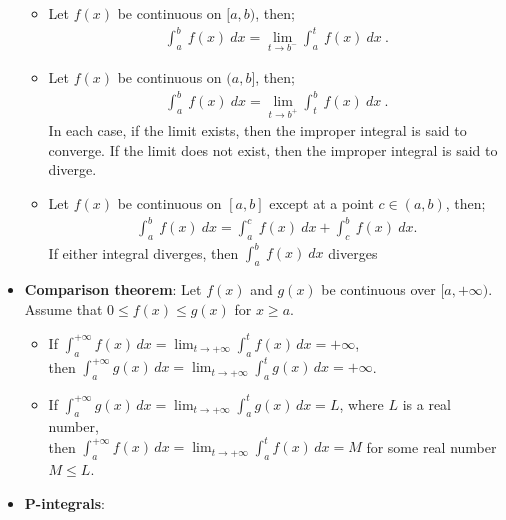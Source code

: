 \documentclass{report}
\begin{document}
\begin{itemize}
\begin{itemize}
                \item Let $f(x)$ be continuous on $[a,b)$, then;
                    \begin{align*}
                        \int_{a}^{b}\ f(x)\ dx = \lim\limits_{t \to b^{-}}{\int_{a}^{t}\ f(x)\ dx}\
                    .\end{align*}
                \item Let $f(x)$ be continuous on $(a,b]$, then;
                    \begin{align*}
                        \int_{a}^{b}\ f(x)\ dx = \lim\limits_{t \to b^{+}}{\int_{t}^{b}\ f(x)\ dx}\
                    .\end{align*}
                    In each case, if the limit exists, then the improper integral is said to converge. If the limit does not exist, then the improper integral is said to diverge.
                \item Let $f(x)$ be continuous on $[a,b]$ except at a point $c \in (a,b)$, then;
                    \begin{align*}
                        \int_{a}^{b}\ f(x)\ dx = \int_{a}^{c}\ f(x)\ dx  +\int_{c}^{b}\ f(x)\ dx
                    .\end{align*}
                    If either integral diverges, then $\int_{a}^{b}\ f(x)\ dx $ diverges
            \end{itemize}
        \item \textbf{Comparison theorem}:
            Let $f(x)$ and $g(x)$ be continuous over $[a,+\infty)$. Assume that $0 \leq f(x) \leq g(x)$ for $x \geq a$.
            \begin{itemize}
                \item If $\int_a^{+\infty} f(x) \, dx = \lim_{t \to +\infty} \int_a^t f(x) \, dx = +\infty$,  \\
                    then $\int_a^{+\infty} g(x) \, dx = \lim_{t \to +\infty} \int_a^t g(x) \, dx = +\infty$.
                \item If $\int_a^{+\infty} g(x) \, dx = \lim_{t \to +\infty} \int_a^t g(x) \, dx = L$, where $L$ is a real number,  \\
                    then $\int_a^{+\infty} f(x) \, dx = \lim_{t \to +\infty} \int_a^t f(x) \, dx = M$ for some real number $M \leq L$.
            \end{itemize}
            \pagebreak \bigbreak \noindent 
        \item \textbf{P-integrals}:
            \begin{itemize}

\end{itemize}
\end{itemize}
\end{document}
